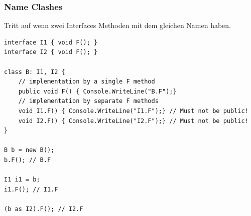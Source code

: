 \subsubsection{Name Clashes}
Tritt auf wenn zwei Interfaces Methoden mit dem gleichen Namen haben.
\begin{lstlisting}
interface I1 { void F(); }
interface I2 { void F(); }

class B: I1, I2 {
	// implementation by a single F method
	public void F() { Console.WriteLine("B.F");}
	// implementation by separate F methods
	void I1.F() { Console.WriteLine("I1.F");} // Must not be public!
	void I2.F() { Console.WriteLine("I2.F");} // Must not be public!
}

B b = new B();
b.F(); // B.F

I1 i1 = b;
i1.F(); // I1.F

(b as I2).F(); // I2.F
\end{lstlisting} 